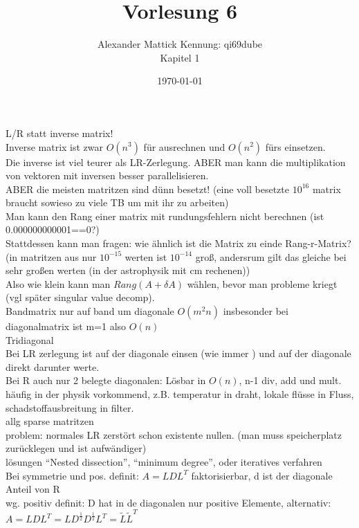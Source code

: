 \documentclass{article}
\author{
Alexander Mattick Kennung: qi69dube\\
Kapitel 1
}
\date{\today}
\title{Vorlesung 6}
\begin{document}
	\maketitle
	L/R statt inverse matrix!\\
	Inverse matrix ist zwar $O(n^3)$ für ausrechnen und $O(n^2)$ fürs einsetzen.\\
	Die inverse ist viel teurer als LR-Zerlegung. ABER man kann die multiplikation von vektoren mit inversen besser parallelisieren.\\
	ABER die meisten matritzen sind dünn besetzt! (eine voll besetzte $10^{16}$ matrix braucht sowieso zu viele TB um mit ihr zu arbeiten)\\
	
	Man kann den Rang einer matrix mit rundungsfehlern nicht berechnen (ist 0.000000000001==0?)\\
	Stattdessen kann man fragen: wie ähnlich ist die Matrix zu einde Rang-r-Matrix? (in matritzen aus nur $10^{-15}$ werten ist $10^{-14}$ groß, andersrum gilt das gleiche bei sehr großen werten (in der astrophysik mit cm rechenen))\\
	Also wie klein kann man $Rang(A+\delta A)$ wählen, bevor man probleme kriegt (vgl später singular value decomp).\\
	Bandmatrix nur auf band um diagonale $O(m^2 n)$ insbesonder bei diagonalmatrix ist m=1 also $O(n)$\\
	Tridiagonal\\
	Bei LR zerlegung ist auf der diagonale einsen (wie immer ) und auf der diagonale direkt darunter werte.\\
	Bei R auch nur 2 belegte diagonalen: Lösbar in $O(n)$, n-1 div, add und mult.\\
	häufig in der physik vorkommend, z.B. temperatur in draht, lokale flüsse in Fluss, schadstoffausbreitung in filter.\\
	allg sparse matritzen\\
	problem: normales LR zerstört schon existente nullen. (man muss speicherplatz zurücklegen und ist aufwändiger)\\
	lösungen ``Nested dissection'', ``minimum degree'', oder iteratives verfahren\\
	Bei symmetrie und pos. definit: $A = LDL^T$ faktorisierbar, d ist der diagonale Anteil von R\\
	wg. positiv definit: D hat in de diagonalen nur positive Elemente, alternativ:\\
	$A=LDL^T = LD^{\frac{1}{2}}D^{\frac{1}{2}} L^T = \tilde L \tilde L^T$\\
\end{document}
